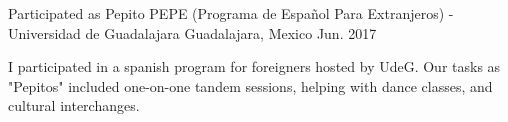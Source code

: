 \begin{cventries}
  \cventry
    {Participated as Pepito}
    {PEPE (Programa de Español Para Extranjeros) - Universidad de Guadalajara}
    {Guadalajara, Mexico}
    {Jun. 2017}
    {
      \begin{cvitems}
        \item {I participated in a spanish program for foreigners hosted by UdeG. Our tasks as "Pepitos" included one-on-one tandem sessions, helping with dance classes, and cultural interchanges.}
      \end{cvitems}
    }
\end{cventries}
